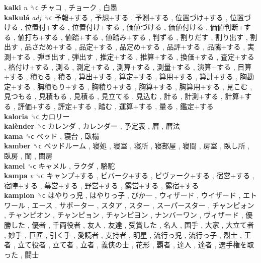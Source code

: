 \textbf{kalki} \emph{n}  ␝ϲ   チャコ ,  チョーク ,  白墨   \\
\textbf{kalkulá} \emph{adj}  ␝ϲ   予報+する ,  予想+する ,  予測+する ,  位置づけ+する ,  位置づける ,  位置付+する ,  位置付け+する ,  価値づける ,  価値付ける ,  価値判断+する ,  値打ち+する ,  値踏+する ,  値踏み+する ,  判ずる ,  割りだす ,  割り出す ,  割出す ,  品さだめ+する ,  品定+する ,  品定め+する ,  品評+する ,  品隲+する ,  実測+する ,  弾き出す ,  弾出す ,  推定+する ,  推算+する ,  換価+する ,  査定+する ,  格付け+する ,  測る ,  測定+する ,  測算+する ,  測量+する ,  演算+する ,  目算+する ,  積もる ,  積る ,  算出+する ,  算定+する ,  算用+する ,  算計+する ,  胸勘定+する ,  胸積もり+する ,  胸積り+する ,  胸算+する ,  胸算用+する ,  見こむ ,  見つもる ,  見積もる ,  見積る ,  見立てる ,  見込む ,  計る ,  計測+する ,  計算+する ,  評価+する ,  評定+する ,  踏む ,  運算+する ,  量る ,  鑑定+する   \\
\textbf{kaloria} ␝ϲ   カロリー   \\
\textbf{kalènder} ␝ϲ   カレンダ ,  カレンダー ,  予定表 ,  暦 ,  暦法   \\
\textbf{kama} ␝ϲ   ベッド ,  寝台 ,  臥榻   \\
\textbf{kamber} ␝ϲ   ベッドルーム ,  寝処 ,  寝室 ,  寝所 ,  寝部屋 ,  寝間 ,  房室 ,  臥し所 ,  臥房 ,  閨 ,  閨房   \\
\textbf{kamel} ␝ϲ   キャメル ,  ラクダ ,  駱駝   \\
\textbf{kampa} \emph{v}  ␝ϲ   キャンプ+する ,  ビバーク+する ,  ビヴァーク+する ,  宿営+する ,  宿陣+する ,  幕営+する ,  野営+する ,  露営+する ,  露宿+する   \\
\textbf{kampion} ␝ϲ   はやりっ児 ,  はやりっ子 ,  ぴか一 ,  ウィザード ,  ウイザード ,  エトワール ,  エース ,  サポーター ,  スタア ,  スター ,  スーパースター ,  チャンピォン ,  チャンピオン ,  チャンピョン ,  チャンピヨン ,  ナンバーワン ,  ヴィザード ,  優勝した ,  優者 ,  千両役者 ,  友人 ,  友達 ,  受賞した ,  名人 ,  国手 ,  大家 ,  大立て者 ,  妙手 ,  巨匠 ,  引く手 ,  愛読者 ,  支持者 ,  明星 ,  流行っ児 ,  流行っ子 ,  烈士 ,  王者 ,  立て役者 ,  立て者 ,  立者 ,  義侠の士 ,  花形 ,  覇者 ,  達人 ,  達者 ,  選手権を取った ,  闘士   \\

